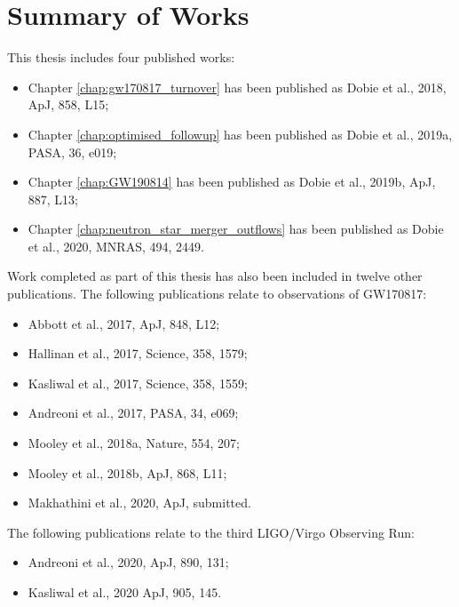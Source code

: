 
\chapter*{Summary of Works}
This thesis includes four published works:
\begin{itemize}
    \setlength\itemsep{0.5em}
    \item[] Chapter \ref{chap:gw170817_turnover} has been published as Dobie et al., 2018, ApJ, 858, L15;
    \item[] Chapter \ref{chap:optimised_followup} has been published as Dobie et al., 2019a, PASA, 36, e019;
    \item[] Chapter \ref{chap:GW190814} has been published as Dobie et al., 2019b, ApJ, 887, L13;
    \item[] Chapter \ref{chap:neutron_star_merger_outflows} has been published as Dobie et al., 2020, MNRAS, 494, 2449.
\end{itemize}

Work completed as part of this thesis has also been included in twelve other publications. The following publications relate to observations of GW170817:

\begin{itemize}
    \setlength\itemsep{0.5em}
    \item[] Abbott et al., 2017, ApJ, 848, L12;
    \item[] Hallinan et al., 2017, Science, 358, 1579;
    \item[] Kasliwal et al., 2017, Science, 358, 1559;
    \item[] Andreoni et al., 2017, PASA, 34, e069;
    \item[] Mooley et al., 2018a, Nature, 554, 207;
    \item[] Mooley et al., 2018b, ApJ, 868, L11;
    \item[] Makhathini et al., 2020, ApJ, submitted.
\end{itemize}

The following publications relate to the third LIGO/Virgo Observing Run:
\begin{itemize}
    \setlength\itemsep{0.5em}
    \item[] Andreoni et al., 2020, ApJ, 890, 131;
    \item[] Kasliwal et al., 2020 ApJ, 905, 145.
\end{itemize}


